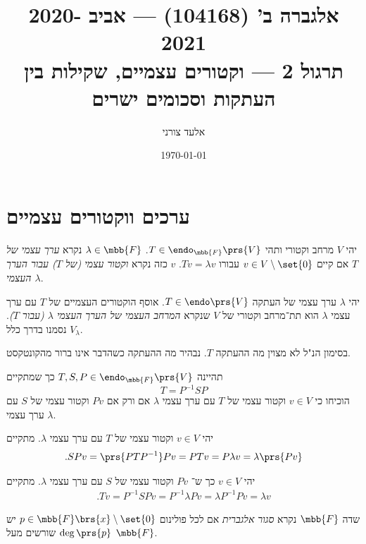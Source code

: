 \documentclass[a4paper,10pt,oneside,openany]{article}
\title{
אלגברה ב' (104168) \textenglish{---} אביב 2020-2021
\\
תרגול 2 \textenglish{---} וקטורים עצמיים, שקילות בין העתקות וסכומים ישרים
}
\author{אלעד צורני}
\date{\today}
\begin{document}
\maketitle

\section{ערכים ווקטורים עצמיים}

\begin{definition}
יהי
$V$
מרחב וקטורי ותהי
$T \in \endo_{\mbb{F}}\prs{V}$.
$\lambda \in \mbb{F}$
נקרא
\emph{ערך עצמי של
$T$}
אם קיים
$v \in V \setminus \set{0}$
עבורו
$Tv = \lambda v$.
$v$
כזה נקרא
\emph{וקטור עצמי
(של $T$)
עבור הערך העצמי
$\lambda$}.
\end{definition}

\begin{definition}
יהי
$\lambda$
ערך עצמי של העתקה
$T \in \endo\prs{V}$.
אוסף הוקטורים העצמיים של
$T$
עם ערך עצמי
$\lambda$
הוא תת־מרחב וקטורי של
$V$
שנקרא
\emph{המרחב העצמי של הערך העצמי
$\lambda$
(עבור $T$)}.
נסמנו בדרך כלל
$V_\lambda$.
\end{definition}

\begin{remark}
בסימון הנ"ל לא מצוין מה ההעתקה
$T$.
נבהיר מה ההעתקה כשהדבר אינו ברור מהקונטקסט.
\end{remark}

\begin{exercise}
תהיינה
$T,S,P \in \endo_{\mbb{F}}\prs{V}$
כך שמתקיים
\[T = P^{-1}SP\]
הוכיחו כי
$v \in V$
וקטור עצמי של
$T$
עם ערך עצמי
$\lambda$
אם ורק אם
$Pv$
וקטור עצמי של
$S$
עם ערך עצמי
$\lambda$.
\end{exercise}

\begin{solution}
יהי
$v \in V$
וקטור עצמי של
$T$
עם ערך עצמי
$\lambda$.
מתקיים
\begin{align*}
\text{.} SPv = \prs{PTP^{-1}}Pv = PTv = P \lambda v = \lambda \prs{Pv} 
\end{align*}

יהי
$v \in V$
כך ש־%
$Pv$
וקטור עצמי של
$S$
עם ערך עצמי
$\lambda$.
מתקיים
\begin{align*}
\text{.} Tv = P^{-1}SPv = P^{-1}\lambda Pv = \lambda P^{-1} P v = \lambda v
\end{align*}
\end{solution}

\begin{definition}
שדה
$\mbb{F}$
נקרא
\emph{סגור אלגברית}
אם לכל פולינום
$p \in \mbb{F}\brs{x} \setminus \set{0}$
יש
$\deg\prs{p}$
שורשים מעל
$\mbb{F}$.
\end{definition}
\end{document}
